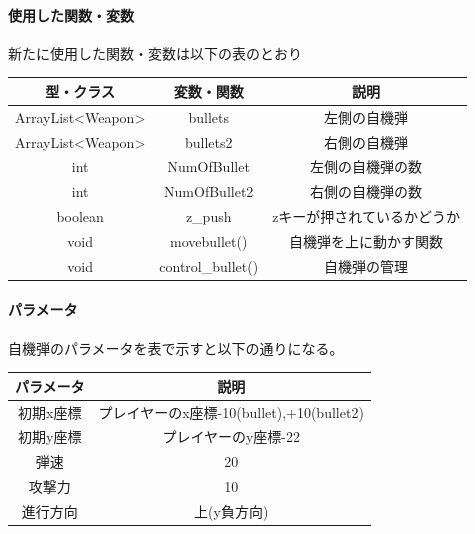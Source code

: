\documentclass[a4paper,titlepage,11pt]{ltjsarticle}
\begin{document}
\paragraph{使用した関数・変数}
新たに使用した関数・変数は以下の表のとおり
\begin{table}[H]
	\begin{center}
		\begin{tabular}{|c|c|c|}
			\hline 
		 型・クラス & 変数・関数 & 説明\\ \hline \hline
		 ArrayList<Weapon> & bullets & 左側の自機弾 \\ \hline
		 ArrayList<Weapon> & bullets2 & 右側の自機弾 \\ \hline
		 int & NumOfBullet & 左側の自機弾の数 \\ \hline
		 int & NumOfBullet2 & 右側の自機弾の数 \\ \hline
		 boolean & z\_push & zキーが押されているかどうか \\ \hline
		 void & movebullet() & 自機弾を上に動かす関数 \\ \hline
		 void & control\_bullet() & 自機弾の管理 \\ \hline 
		\end{tabular}
	\end{center}
\end{table}

\paragraph{パラメータ}
自機弾のパラメータを表で示すと以下の通りになる。
\begin{table}[H]
\centering
\begin{tabular}{|c|c|}
	\hline
	パラメータ & 説明 \\\hline \hline
	初期x座標 & プレイヤーのx座標-10(bullet),+10(bullet2) \\ \hline
	初期y座標 & プレイヤーのy座標-22 \\ \hline
	弾速 & 20 \\ \hline 
	攻撃力 & 10 \\ \hline
	進行方向 & 上(y負方向) \\ \hline
\end{tabular}
\end{table}
\end{document}

